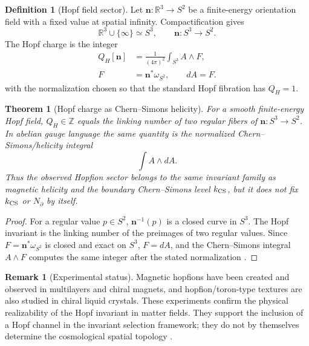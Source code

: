 \documentclass[aps,prd,reprint,nofootinbib,superscriptaddress,floatfix]{revtex4-2}
\numberwithin{equation}{section}
\theoremstyle{definition}
\newtheorem{definition}{Definition}[section]
\newtheorem{remark}{Remark}[section]
\theoremstyle{plain}
\newtheorem{theorem}{Theorem}[section]
\begin{document}
\begin{definition}[Hopf field sector]
Let \(\mathbf n:\mathbb R^3\to S^2\) be a finite-energy orientation
field with a fixed value at spatial infinity.  Compactification gives
\[
\mathbb R^3\cup\{\infty\}\simeq S^3,
\qquad
\mathbf n:S^3\to S^2 .
\]
The Hopf charge is the integer
\begin{align}
Q_H[\mathbf n]
&=
\frac{1}{(4\pi)^2}
\int_{S^3} A\wedge F,
\\
F&=\mathbf n^*\omega_{S^2},
\qquad dA=F .
\end{align}
with the normalization chosen so that the standard Hopf fibration has
\(Q_H=1\).
\end{definition}

\begin{theorem}[Hopf charge as Chern--Simons helicity]
For a smooth finite-energy Hopf field, \(Q_H\in\mathbb Z\) equals the
linking number of two regular fibers of \(\mathbf n:S^3\to S^2\).  In
abelian gauge language the same quantity is the normalized
Chern--Simons/helicity integral
\[
\int A\wedge dA .
\]
Thus the observed Hopfion sector belongs to the same invariant family as
magnetic helicity and the boundary Chern--Simons level \(k_{\rm CS}\),
but it does not fix \(k_{\rm CS}\) or \(N_\partial\) by itself.
\end{theorem}

\begin{proof}
For a regular value \(p\in S^2\), \(\mathbf n^{-1}(p)\) is a closed
curve in \(S^3\).  The Hopf invariant is the linking number of the
preimages of two regular values.  Since \(F=\mathbf n^*\omega_{S^2}\)
is closed and exact on \(S^3\), \(F=dA\), and the Chern--Simons integral
\(A\wedge F\) computes the same integer after the stated normalization \cite{Ranada1989,Moffatt1969,Urbantke2003}.
\end{proof}

\begin{remark}[Experimental status]
Magnetic hopfions have been created and observed in multilayers and
chiral magnets, and hopfion/toron-type textures are also studied in
chiral liquid crystals.  These experiments confirm the physical
realizability of the Hopf invariant in matter fields.  They support the
inclusion of a Hopf channel in the invariant selection framework; they do not by
themselves determine the cosmological spatial topology
\cite{Kent2021,Zheng2023,Ackerman2015}.
\end{remark}
\end{document}
